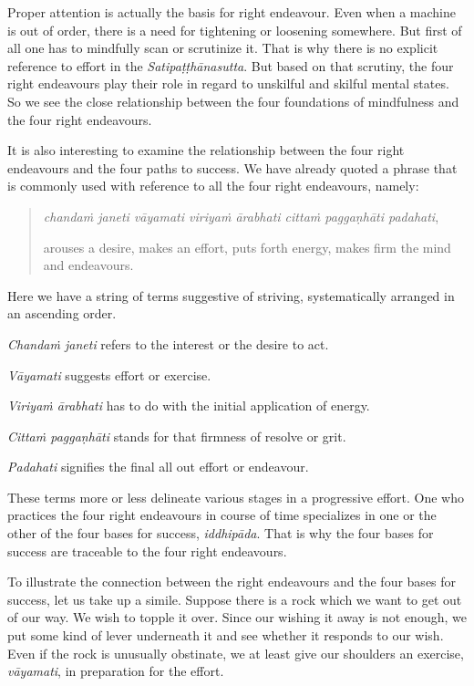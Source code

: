 Proper attention is actually the basis for right endeavour. Even when a machine is out of order, there is a need for tightening or loosening somewhere. But first of all one has to mindfully scan or scrutinize it. That is why there is no explicit reference to effort in the \emph{Satipaṭṭhānasutta}. But based on that scrutiny, the four right endeavours play their role in regard to unskilful and skilful mental states. So we see the close relationship between the four foundations of mindfulness and the four right endeavours.

It is also interesting to examine the relationship between the four right endeavours and the four paths to success. We have already quoted a phrase that is commonly used with reference to all the four right endeavours, namely:

\begin{quote}
\emph{chandaṁ janeti vāyamati viriyaṁ ārabhati cittaṁ paggaṇhāti padahati},

arouses a desire, makes an effort, puts forth energy, makes firm the mind and endeavours.
\end{quote}

Here we have a string of terms suggestive of striving, systematically arranged in an ascending order.

\emph{Chandaṁ janeti} refers to the interest or the desire to act.

\emph{Vāyamati} suggests effort or exercise.

\emph{Viriyaṁ ārabhati} has to do with the initial application of energy.

\emph{Cittaṁ paggaṇhāti} stands for that firmness of resolve or grit.

\emph{Padahati} signifies the final all out effort or endeavour.

These terms more or less delineate various stages in a progressive effort. One who practices the four right endeavours in course of time specializes in one or the other of the four bases for success, \emph{iddhipāda}. That is why the four bases for success are traceable to the four right endeavours.

To illustrate the connection between the right endeavours and the four bases for success, let us take up a simile. Suppose there is a rock which we want to get out of our way. We wish to topple it over. Since our wishing it away is not enough, we put some kind of lever underneath it and see whether it responds to our wish. Even if the rock is unusually obstinate, we at least give our shoulders an exercise, \emph{vāyamati}, in preparation for the effort.

